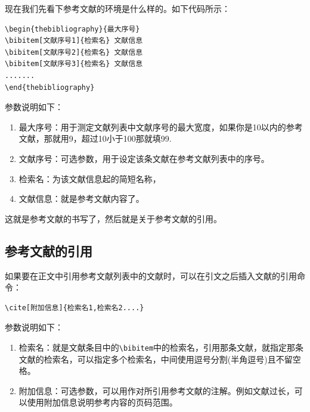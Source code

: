 \documentclass[cn,chinese,color=cyan]{elegantbook}
\begin{document}
现在我们先看下参考文献的环境是什么样的。如下代码所示：
\begin{lstlisting}[style=R]
\begin{thebibliography}{最大序号}
\bibitem[文献序号1]{检索名} 文献信息
\bibitem[文献序号2]{检索名} 文献信息
\bibitem[文献序号3]{检索名} 文献信息
.......
\end{thebibliography}
\end{lstlisting}
参数说明如下：
\begin{enumerate}
	\item 最大序号：用于测定文献列表中文献序号的最大宽度，如果你是10以内的参考文献，那就用9，超过10小于100那就填99.
	\item 文献序号：可选参数，用于设定该条文献在参考文献列表中的序号。
	\item 检索名：为该文献信息起的简短名称，
	\item 文献信息：就是参考文献内容了。
\end{enumerate}
这就是参考文献的书写了，然后就是关于参考文献的引用。
\subsection{参考文献的引用}
如果要在正文中引用参考文献列表中的文献时，可以在引文之后插入文献的引用命令：
\begin{lstlisting}[style=R]
\cite[附加信息]{检索名1,检索名2....}
\end{lstlisting}
参数说明如下：
\begin{enumerate}
	\item 检索名：就是文献条目中的\verb|\bibitem|中的检索名，引用那条文献，就指定那条文献的检索名，可以指定多个检索名，中间使用逗号分割(半角逗号)且不留空格。
	\item 附加信息：可选参数，可以用作对所引用参考文献的注解。例如文献过长，可以使用附加信息说明参考内容的页码范围。
\end{enumerate}
\end{document}
